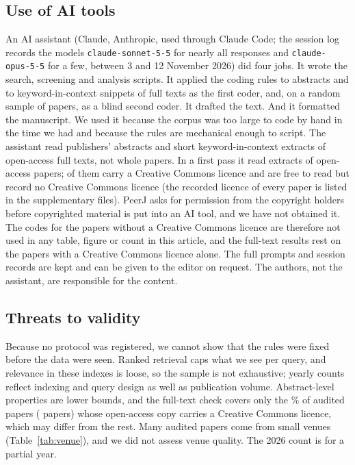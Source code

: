\documentclass[12pt]{article}
\begin{document}
\subsection{Use of AI tools}\label{sec:ai}
An AI assistant (Claude, Anthropic, used through Claude Code; the session log records the models \texttt{claude-sonnet-5-5} for nearly all responses and \texttt{claude-opus-5-5} for a few, between 3 and 12 November 2026) did four jobs. It wrote the search, screening and analysis scripts. It applied the coding rules to abstracts and to keyword-in-context snippets of full texts as the first coder, and, on a random sample of \agNAll{} papers, as a blind second coder. It drafted the text. And it formatted the manuscript. We used it because the corpus was too large to code by hand in the time we had and because the rules are mechanical enough to script. The assistant read publishers' abstracts and short keyword-in-context extracts of open-access full texts, not whole papers. In a first pass it read extracts of \ftAllN{} open-access papers; \ftLicCC{} of them carry a Creative Commons licence and \ftLicNone{} are free to read but record no Creative Commons licence (the recorded licence of every paper is listed in the supplementary files). PeerJ asks for permission from the copyright holders before copyrighted material is put into an AI tool, and we have not obtained it. The codes for the \ftLicNone{} papers without a Creative Commons licence are therefore not used in any table, figure or count in this article, and the full-text results rest on the \ftLicCC{} papers with a Creative Commons licence alone. The full prompts and session records are kept and can be given to the editor on request. The authors, not the assistant, are responsible for the content. \humanThreat{}

\subsection{Threats to validity}
Because no protocol was registered, we cannot show that the rules were fixed before the data were seen. Ranked retrieval caps what we see per query, and relevance in these indexes is loose, so the sample is not exhaustive; yearly counts reflect indexing and query design as well as publication volume. \srcThreat{} Abstract-level properties are lower bounds, and the full-text check covers only the \ftCcPct\% of audited papers (\ftN{} papers) whose open-access copy carries a Creative Commons licence, which may differ from the rest. Many audited papers come from small venues (Table~\ref{tab:venue}), and we did not assess venue quality. \humanThreat{} The 2026 count is for a partial year.
\end{document}
